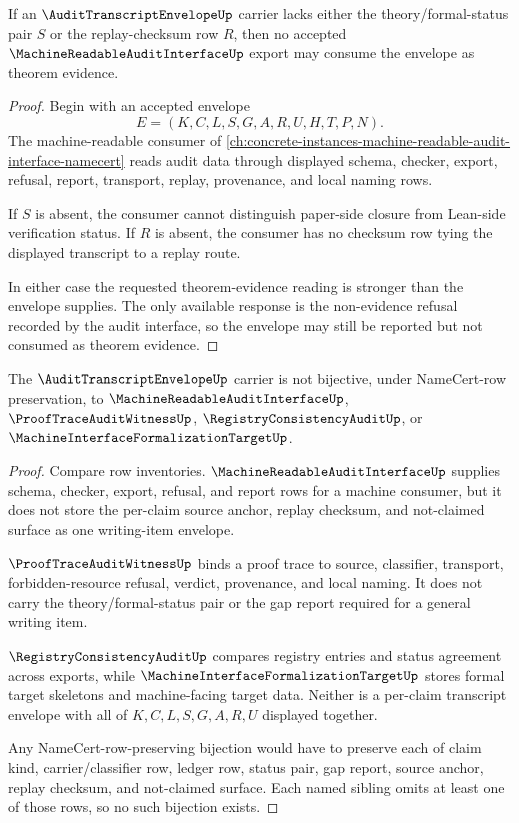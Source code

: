 \begin{theorem}
\label{thm:audit-transcript-envelope-non-evidence-refusal}
If an $\AuditTranscriptEnvelopeUp$ carrier lacks either the theory/formal-status pair $S$ or the replay-checksum row $R$, then no accepted $\MachineReadableAuditInterfaceUp$ export may consume the envelope as theorem evidence.
\end{theorem}
\begin{proof}
Begin with an accepted envelope
$$
E=(K,C,L,S,G,A,R,U,H,T,P,N).
$$
The machine-readable consumer of \autoref{ch:concrete-instances-machine-readable-audit-interface-namecert} reads audit data through displayed schema, checker, export, refusal, report, transport, replay, provenance, and local naming rows.

If $S$ is absent, the consumer cannot distinguish paper-side closure from Lean-side verification status. If $R$ is absent, the consumer has no checksum row tying the displayed transcript to a replay route.

In either case the requested theorem-evidence reading is stronger than the envelope supplies. The only available response is the non-evidence refusal recorded by the audit interface, so the envelope may still be reported but not consumed as theorem evidence.
\end{proof}

\begin{theorem}
\label{thm:audit-transcript-envelope-sibling-independence}
The $\AuditTranscriptEnvelopeUp$ carrier is not bijective, under NameCert-row preservation, to $\MachineReadableAuditInterfaceUp$, $\ProofTraceAuditWitnessUp$, $\RegistryConsistencyAuditUp$, or $\MachineInterfaceFormalizationTargetUp$.
\end{theorem}
\begin{proof}
Compare row inventories. $\MachineReadableAuditInterfaceUp$ supplies schema, checker, export, refusal, and report rows for a machine consumer, but it does not store the per-claim source anchor, replay checksum, and not-claimed surface as one writing-item envelope.

$\ProofTraceAuditWitnessUp$ binds a proof trace to source, classifier, transport, forbidden-resource refusal, verdict, provenance, and local naming. It does not carry the theory/formal-status pair or the gap report required for a general writing item.

$\RegistryConsistencyAuditUp$ compares registry entries and status agreement across exports, while $\MachineInterfaceFormalizationTargetUp$ stores formal target skeletons and machine-facing target data. Neither is a per-claim transcript envelope with all of $K,C,L,S,G,A,R,U$ displayed together.

Any NameCert-row-preserving bijection would have to preserve each of claim kind, carrier/classifier row, ledger row, status pair, gap report, source anchor, replay checksum, and not-claimed surface. Each named sibling omits at least one of those rows, so no such bijection exists.
\end{proof}

